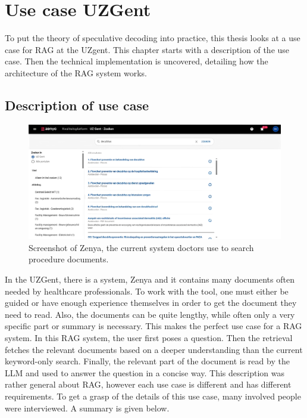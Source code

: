
\chapter{Use case UZGent}
\label{sec:use_case_uzgent}
To put the theory of speculative decoding into practice, this thesis looks at a use case for RAG at the UZgent. This chapter starts with a description of the use case. Then the technical implementation is uncovered, detailing how the architecture of the RAG system works.

\section{Description of use case}

\begin{figure}[h]
	\centering
	\includegraphics[width=\linewidth]{fig/zenya.png}
	\caption{Screenshot of Zenya, the current system doctors use to search procedure documents.}
	\label{fig:zenya}
\end{figure}

In the UZGent, there is a system, Zenya and it contains many documents often needed by healthcare professionals. To work with the tool, one must either be guided or have enough experience themselves in order to get the document they need to read. Also, the documents can be quite lengthy, while often only a very specific part or summary is necessary. This makes the perfect use case for a RAG system. In this RAG system, the user first poses a question. Then the retrieval fetches the relevant documents based on a deeper understanding than the current keyword-only search. Finally, the relevant part of the document is read by the LLM and used to answer the question in a concise way. This description was rather general about RAG, however each use case is different and has different requirements. To get a grasp of the details of this use case, many involved people were interviewed. A summary is given below.

